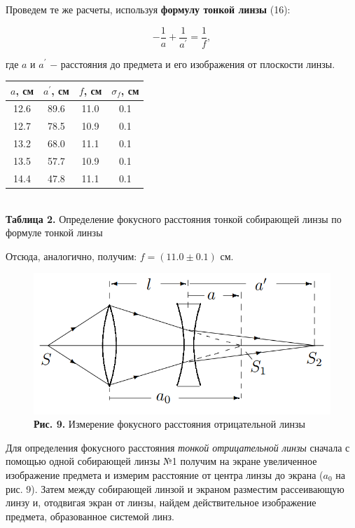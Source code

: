 \documentclass[a4paper,12pt]{article} %
\begin{document}
\hfill \break Проведем те же расчеты, используя \textbf{формулу тонкой линзы} (16):

$$
- \frac{1}{a} + \frac{1} {a^\prime} = \frac{1}{f},
$$

\hfill \break где $a$ и $a^\prime$ $-$ расстояния до предмета и его изображения от плоскости линзы.
\hfill \break

\begin{center}
\begin{tabular}{|c|c|c|c|}\hline
$ a $, см & $ a^\prime $, см & $ f $, см & $ \sigma_f $, см \\\hline
12.6 & 89.6 & 11.0 & 0.1 \\\hline
12.7 & 78.5 & 10.9 & 0.1 \\\hline
13.2 & 68.0 & 11.1 & 0.1 \\\hline
13.5 & 57.7 & 10.9 & 0.1 \\\hline
14.4 & 47.8 & 11.1 & 0.1 \\\hline
\end{tabular} \\
\hfill \break \textbf {Таблица 2.} Определение фокусного расстояния тонкой собирающей линзы по формуле тонкой линзы\\
\end{center}

\hfill \break Отсюда, аналогично, получим: $f = (11.0 \pm 0.1)$ см.

\begin{figure}
\begin{center}
    \includegraphics[width=1\textwidth]{4.1.1_9.png}
    \textbf{Рис. 9.} Измерение фокусного расстояния отрицательной линзы
\end{center}
\end{figure}

\hfill \break Для определения фокусного расстояния \textit{тонкой отрицательной линзы} сначала с помощью одной собирающей линзы №1 получим на экране увеличенное изображение предмета и измерим расстояние от центра линзы до экрана ($a_{0}$ на рис. 9). Затем между собирающей линзой и экраном разместим рассеивающую линзу и, отодвигая экран от линзы, найдем действительное изображение предмета, образованное системой линз.
\end{document}
